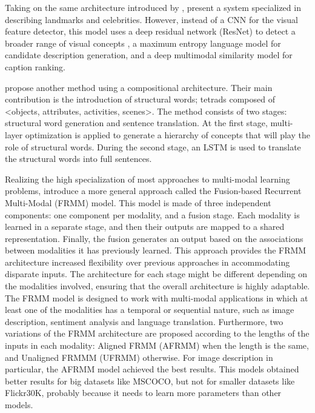 Taking on the same architecture introduced by \citet{Fang2015}, \citet{Tran2016} present a system specialized in describing landmarks and celebrities. However, instead of a CNN for the visual feature detector, this model uses a deep residual network (ResNet) to detect a broader range of visual concepts \cite{He2016a}, a maximum entropy language model for candidate description generation, and a deep multimodal similarity model for caption ranking. 

\citet{Ma2016} propose another method using a compositional architecture. Their main contribution is the introduction of structural words; tetrads composed of <objects, attributes, activities, scenes>. The method consists of two stages: structural word generation and sentence translation. At the first stage, multi-layer optimization is applied to generate a hierarchy of concepts that will play the role of structural words. During the second stage, an LSTM is used to translate the structural words into full sentences.

Realizing the high specialization of most approaches to multi-modal learning problems, \citet{Oruganti2016} introduce a more general approach called the Fusion-based Recurrent Multi-Modal (FRMM) model. This model is made of three independent components: one component per modality, and a fusion stage. Each modality is learned in a separate stage, and then their outputs are mapped to a shared representation. Finally, the fusion generates an output based on the associations between modalities it has previously learned. This approach provides the FRMM architecture increased flexibility over previous approaches in accommodating disparate inputs. The architecture for each stage might be different depending on the modalities involved, ensuring that the overall architecture is highly adaptable. The FRMM model is designed to work with multi-modal applications in which at least one of the modalities has a temporal or sequential nature, such as image description, sentiment analysis and language translation. Furthermore, two variations of the FRMM architecture are proposed according to the lengths of the inputs in each modality: Aligned FRMM (AFRMM) when the length is the same, and Unaligned FRMMM (UFRMM) otherwise. For image description in particular, the AFRMM model achieved the best results. This models obtained better results for big datasets like MSCOCO, but not for smaller datasets like Flickr30K, probably because it needs to learn more parameters than other models. 

